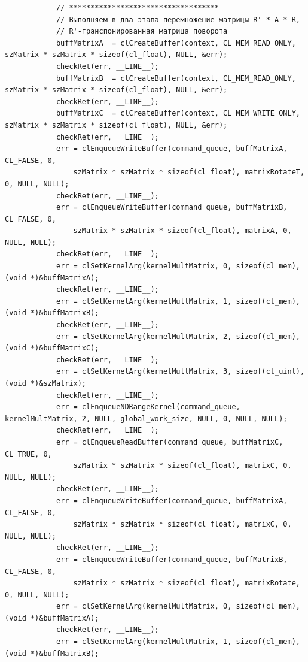 \documentclass[utf8, 12pt, a4paper, oneside]{article}
\begin{document}
\begin{lstlisting}
			// *********************************** 
			// Выполняем в два этапа перемножение матрицы R' * A * R, 
			// R'-транспонированная матрица поворота		
            buffMatrixA  = clCreateBuffer(context, CL_MEM_READ_ONLY, szMatrix * szMatrix * sizeof(cl_float), NULL, &err);
            checkRet(err, __LINE__);
            buffMatrixB  = clCreateBuffer(context, CL_MEM_READ_ONLY, szMatrix * szMatrix * sizeof(cl_float), NULL, &err);
            checkRet(err, __LINE__);            
            buffMatrixC  = clCreateBuffer(context, CL_MEM_WRITE_ONLY, szMatrix * szMatrix * sizeof(cl_float), NULL, &err);
            checkRet(err, __LINE__);
            err = clEnqueueWriteBuffer(command_queue, buffMatrixA, CL_FALSE, 0, 
                szMatrix * szMatrix * sizeof(cl_float), matrixRotateT, 0, NULL, NULL);        
            checkRet(err, __LINE__);
            err = clEnqueueWriteBuffer(command_queue, buffMatrixB, CL_FALSE, 0, 
                szMatrix * szMatrix * sizeof(cl_float), matrixA, 0, NULL, NULL);        
            checkRet(err, __LINE__);            
            err = clSetKernelArg(kernelMultMatrix, 0, sizeof(cl_mem), (void *)&buffMatrixA);
            checkRet(err, __LINE__);            
            err = clSetKernelArg(kernelMultMatrix, 1, sizeof(cl_mem), (void *)&buffMatrixB);
            checkRet(err, __LINE__);            
            err = clSetKernelArg(kernelMultMatrix, 2, sizeof(cl_mem), (void *)&buffMatrixC);
            checkRet(err, __LINE__);                        
            err = clSetKernelArg(kernelMultMatrix, 3, sizeof(cl_uint), (void *)&szMatrix);
            checkRet(err, __LINE__);                                    
            err = clEnqueueNDRangeKernel(command_queue, kernelMultMatrix, 2, NULL, global_work_size, NULL, 0, NULL, NULL);
            checkRet(err, __LINE__);
            err = clEnqueueReadBuffer(command_queue, buffMatrixC, CL_TRUE, 0, 
                szMatrix * szMatrix * sizeof(cl_float), matrixC, 0, NULL, NULL);
            checkRet(err, __LINE__);
            err = clEnqueueWriteBuffer(command_queue, buffMatrixA, CL_FALSE, 0, 
                szMatrix * szMatrix * sizeof(cl_float), matrixC, 0, NULL, NULL);        
            checkRet(err, __LINE__);
            err = clEnqueueWriteBuffer(command_queue, buffMatrixB, CL_FALSE, 0, 
                szMatrix * szMatrix * sizeof(cl_float), matrixRotate, 0, NULL, NULL);        
            err = clSetKernelArg(kernelMultMatrix, 0, sizeof(cl_mem), (void *)&buffMatrixA);
            checkRet(err, __LINE__);            
            err = clSetKernelArg(kernelMultMatrix, 1, sizeof(cl_mem), (void *)&buffMatrixB);

\end{lstlisting}
\end{document}
